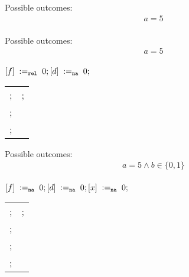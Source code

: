 \begin{minipage}[t]{0.3\linewidth}
Possible outcomes:\\
\[\begin{array}{l}
a = 5 \\
\end{array}\]
\end{minipage}
%
\mpTemplate{\rlx}{\na}{\na}{\rel}{\acq}{\na}
\litmusTestEnd

\begin{minipage}[t]{0.3\linewidth}
Possible outcomes:\\
\[\begin{array}{l}
a = 5 \\
\end{array}\]
\end{minipage}
%
\codePrefix
  $[f] \;:=_{{\mathtt{rel}}}\;0; [d] \;:=_{\mathtt{na}}\;0;$ \\
  \begin{tabular}{L || L}
    ; & ; \\
    ; & \\
    ; & \\
  \end{tabular}
\codePostfix
\litmusTestEnd

\begin{minipage}[t]{0.3\linewidth}
Possible outcomes:\\
\[\begin{array}{l}
a = 5 \land b \in \{0, 1\} \\
\end{array}\]
\end{minipage}
%
\codePrefix
  $[f] \;:=_{\mathtt{na}}\;0; [d] \;:=_{\mathtt{na}}\;0; [x] \;:=_{\mathtt{na}}\;0;$ \\
  \begin{tabular}{L || L}
    ;  & ; \\
    ; & \\
    ; & \\
    ; & \\
  \end{tabular}
\codePostfix
\litmusTestEnd

